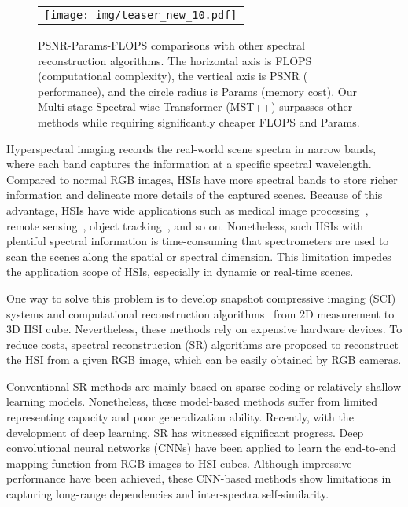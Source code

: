 \documentclass[10pt,twocolumn,letterpaper]{article}
\begin{document}
\begin{figure}[h]
	\begin{center}
		\begin{tabular}[t]{c} \hspace{-3.8mm} 
			\texttt{[image: img/teaser\_new\_10.pdf]}
		\end{tabular}
	\end{center}
	\vspace{-8mm}
	\caption{\small PSNR-Params-FLOPS comparisons with other spectral reconstruction algorithms. The horizontal axis is FLOPS (computational complexity), the vertical axis is PSNR ( performance), and the circle radius is Params (memory cost). Our Multi-stage Spectral-wise Transformer (MST++) surpasses other methods while requiring significantly cheaper FLOPS and Params. }
	\label{fig:teaser}
	\vspace{-5mm}
\end{figure}


Hyperspectral imaging records the real-world scene spectra in narrow bands, where each band captures the information at a specific spectral wavelength. Compared to normal RGB images, HSIs have more spectral bands to store richer information and delineate more details of the captured scenes. Because of this advantage, HSIs have wide applications such as medical image processing~\cite{mi_1,mi_2,mi_3}, remote sensing~\cite{rs_1,rs_2,rs_3}, object tracking~\cite{ot_1,ot_2}, and so on. Nonetheless, such HSIs with plentiful spectral information is time-consuming that spectrometers are used to scan the scenes along the
spatial or spectral dimension. This limitation impedes the application scope of HSIs, especially in dynamic or real-time scenes.

One way to solve this problem is to develop snapshot compressive imaging (SCI) systems and computational reconstruction algorithms~\cite{mst,pngan,hdnet,cst,gap_tv,gapnet,tsa_net,lambda,gsm,hssp,dnu,desci,twist,self,PDMSR} from 2D measurement to 3D HSI cube. Nevertheless, these methods rely on expensive hardware devices. To reduce costs, spectral reconstruction (SR) algorithms are proposed to reconstruct the HSI from a given RGB image, which can be easily obtained by RGB cameras. 

Conventional SR methods are mainly based on sparse coding or relatively shallow learning models. Nonetheless, these model-based methods suffer from limited representing capacity and poor generalization ability. Recently, with the development of deep learning, SR has witnessed significant progress. Deep convolutional neural networks (CNNs) have been applied to learn the end-to-end mapping function from  RGB images to HSI cubes. Although impressive performance have been achieved, these CNN-based methods show limitations in capturing long-range dependencies and inter-spectra self-similarity.
\end{document}

